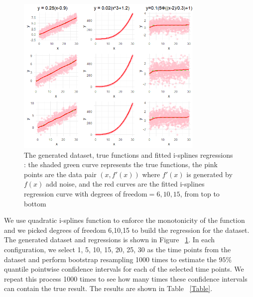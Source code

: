 \documentclass[12pt]{article}
\begin{document}
\begin{figure}[H]
  \centering
  \includegraphics[width=0.8\textwidth]{DataAndRegressions.png}
  \caption{The generated dataset, true functions and fitted i-splines regressions
  : the shaded green curve represents the true functions, the pink points are the
  data pair \((x, f'(x))\) where \(f'(x)\) is generated by \(f(x)\) add noise,
  and the red curves are the fitted i-splines regression curve with degrees of 
  freedom\(= 6,10,15\), from top to bottom}
  \label{fig:DataAndRegressions}
\end{figure}

We use quadratic i-splines function to enforce the monotonicity of the function
and we picked degrees of freedom 6,10,15 to build the regression for the dataset.
The generated dataset and regressions is shown in Figure 
~\ref{fig:DataAndRegressions}. In each configuration, we select 1, 5, 10, 15, 20,
25, 30 as the time points from the dataset and perform bootstrap resampling 1000 
times to estimate the \(95\%\) quantile pointwise confidence intervals for each 
of the selected time points. We repeat this process 1000 times to see how many 
times these confidence intervals can contain the true result. The results are 
shown in Table ~\ref{Table}. 
\end{document}
